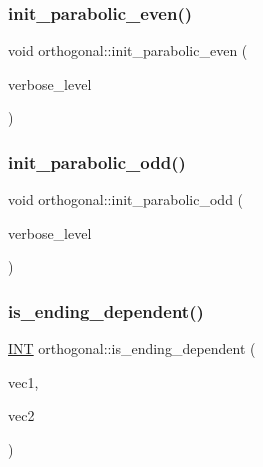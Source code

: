 \mbox{\label{classorthogonal_a495354fe027c383b4dd9ee3906dcde92}} 
\subsubsection{\texorpdfstring{init\+\_\+parabolic\+\_\+even()}{init\_parabolic\_even()}}
{\footnotesize\ttfamily void orthogonal\+::init\+\_\+parabolic\+\_\+even (\begin{DoxyParamCaption}\item[{\mbox{\hyperlink{galois_8h_a09fddde158a3a20bd2dcadb609de11dc}{I\+NT}}}]{verbose\+\_\+level }\end{DoxyParamCaption})}

\mbox{\label{classorthogonal_adeb14ce7821acee632e1a1ca3975a201}} 
\subsubsection{\texorpdfstring{init\+\_\+parabolic\+\_\+odd()}{init\_parabolic\_odd()}}
{\footnotesize\ttfamily void orthogonal\+::init\+\_\+parabolic\+\_\+odd (\begin{DoxyParamCaption}\item[{\mbox{\hyperlink{galois_8h_a09fddde158a3a20bd2dcadb609de11dc}{I\+NT}}}]{verbose\+\_\+level }\end{DoxyParamCaption})}

\mbox{\label{classorthogonal_ac73b14e7da4d8a1a84750c345dfabd99}} 
\subsubsection{\texorpdfstring{is\+\_\+ending\+\_\+dependent()}{is\_ending\_dependent()}}
{\footnotesize\ttfamily \mbox{\hyperlink{galois_8h_a09fddde158a3a20bd2dcadb609de11dc}{I\+NT}} orthogonal\+::is\+\_\+ending\+\_\+dependent (\begin{DoxyParamCaption}\item[{\mbox{\hyperlink{galois_8h_a09fddde158a3a20bd2dcadb609de11dc}{I\+NT}} $\ast$}]{vec1,  }\item[{\mbox{\hyperlink{galois_8h_a09fddde158a3a20bd2dcadb609de11dc}{I\+NT}} $\ast$}]{vec2 }\end{DoxyParamCaption})}

